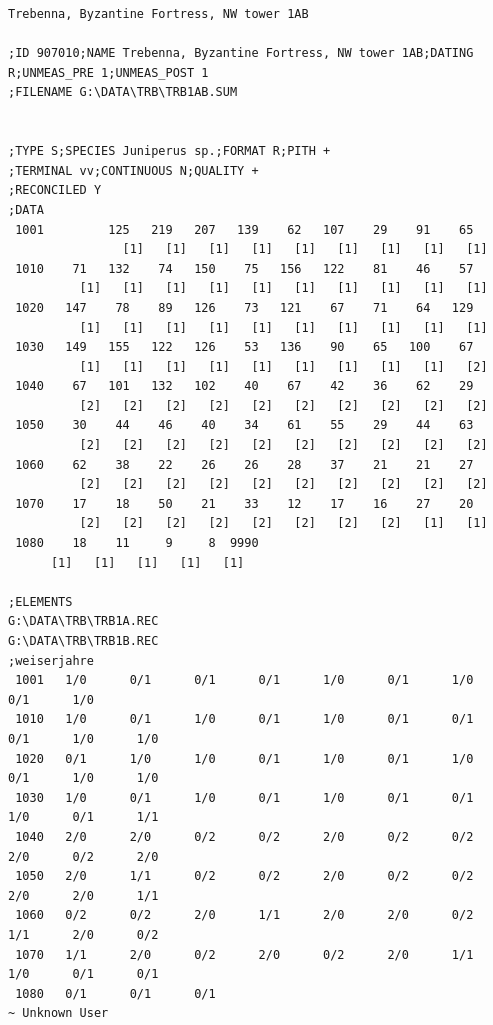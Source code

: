 \begin{lstlisting}
Trebenna, Byzantine Fortress, NW tower 1AB

;ID 907010;NAME Trebenna, Byzantine Fortress, NW tower 1AB;DATING R;UNMEAS_PRE 1;UNMEAS_POST 1
;FILENAME G:\DATA\TRB\TRB1AB.SUM


;TYPE S;SPECIES Juniperus sp.;FORMAT R;PITH +
;TERMINAL vv;CONTINUOUS N;QUALITY +
;RECONCILED Y
;DATA         
 1001         125   219   207   139    62   107    29    91    65
                [1]   [1]   [1]   [1]   [1]   [1]   [1]   [1]   [1]
 1010    71   132    74   150    75   156   122    81    46    57
          [1]   [1]   [1]   [1]   [1]   [1]   [1]   [1]   [1]   [1]
 1020   147    78    89   126    73   121    67    71    64   129
          [1]   [1]   [1]   [1]   [1]   [1]   [1]   [1]   [1]   [1]
 1030   149   155   122   126    53   136    90    65   100    67
          [1]   [1]   [1]   [1]   [1]   [1]   [1]   [1]   [1]   [2]
 1040    67   101   132   102    40    67    42    36    62    29
          [2]   [2]   [2]   [2]   [2]   [2]   [2]   [2]   [2]   [2]
 1050    30    44    46    40    34    61    55    29    44    63
          [2]   [2]   [2]   [2]   [2]   [2]   [2]   [2]   [2]   [2]
 1060    62    38    22    26    26    28    37    21    21    27
          [2]   [2]   [2]   [2]   [2]   [2]   [2]   [2]   [2]   [2]
 1070    17    18    50    21    33    12    17    16    27    20
          [2]   [2]   [2]   [2]   [2]   [2]   [2]   [2]   [1]   [1]
 1080    18    11     9     8  9990
      [1]   [1]   [1]   [1]   [1]

;ELEMENTS 
G:\DATA\TRB\TRB1A.REC
G:\DATA\TRB\TRB1B.REC
;weiserjahre   
 1001   1/0      0/1      0/1      0/1      1/0      0/1      1/0      0/1      1/0   
 1010   1/0      0/1      1/0      0/1      1/0      0/1      0/1      0/1      1/0      1/0   
 1020   0/1      1/0      1/0      0/1      1/0      0/1      1/0      0/1      1/0      1/0   
 1030   1/0      0/1      1/0      0/1      1/0      0/1      0/1      1/0      0/1      1/1   
 1040   2/0      2/0      0/2      0/2      2/0      0/2      0/2      2/0      0/2      2/0   
 1050   2/0      1/1      0/2      0/2      2/0      0/2      0/2      2/0      2/0      1/1   
 1060   0/2      0/2      2/0      1/1      2/0      2/0      0/2      1/1      2/0      0/2   
 1070   1/1      2/0      0/2      2/0      0/2      2/0      1/1      1/0      0/1      0/1   
 1080   0/1      0/1      0/1   
~ Unknown User
\end{lstlisting}




